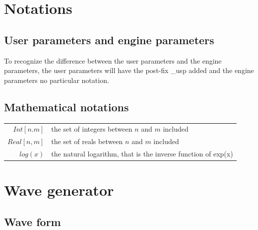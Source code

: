\documentclass[11pt]{report}
\begin{document}
\section{Notations}
\subsection{User parameters and engine parameters}
To recognize the difference
between the user parameters and the engine parameters, the user parameters
will have the post-fix \_usp added and the engine parameters
no particular notation.
\subsection{Mathematical notations}
\begin{tabular}{rl}
  $Int[n.m]$ & the set of integers between $n$ and $m$ included\\
  $Real[n, m]$ & the set of reals between $n$ and $m$ included\\
  $log(x)$ & the natural logarithm, that is the inverse function of exp(x)
\end{tabular}

\section{Wave generator}

\subsection{Wave form}
\end{document}
